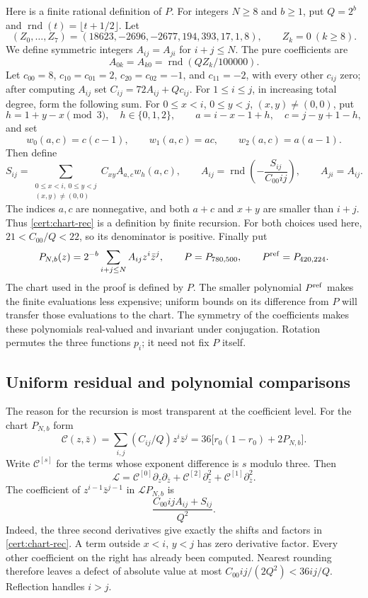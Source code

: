Here is a finite rational definition of $P$.  For integers $N\geq8$ and
$b\geq1$, put $Q=2^b$ and $\operatorname{rnd}(t)=\lfloor t+1/2\rfloor$.
Let
\[
 (Z_0,\ldots,Z_7)=(18623,-2696,-2677,194,393,17,1,8),\qquad Z_k=0\ (k\geq8).
\]
We define symmetric integers $A_{ij}=A_{ji}$ for $i+j\leq N$.  The pure
coefficients are
\[
 A_{0k}=A_{k0}=\operatorname{rnd}(QZ_k/100000).
\]
Let $c_{00}=8$, $c_{10}=c_{01}=2$, $c_{20}=c_{02}=-1$, and $c_{11}=-2$,
with every other $c_{ij}$ zero; after computing $A_{ij}$ set
$C_{ij}=72A_{ij}+Qc_{ij}$.  For $1\leq i\leq j$, in increasing total degree,
form the following sum.  For $0\leq x<i$, $0\leq y<j$, $(x,y)\ne(0,0)$,
put
\[
 h=1+y-x\pmod 3,\quad h\in\{0,1,2\},\qquad
 a=i-x-1+h,\quad c=j-y+1-h,
\]
and set
\[
 w_0(a,c)=c(c-1),\qquad w_1(a,c)=ac,\qquad w_2(a,c)=a(a-1).
\]
Then define
\begin{equation}\label{cert:chart-rec}
 S_{ij}=\sum_{\substack{0\leq x<i,\ 0\leq y<j\\(x,y)\ne(0,0)}}
             C_{xy}A_{a,c}w_h(a,c),\qquad
 A_{ij}=\operatorname{rnd}\left(-\frac{S_{ij}}{C_{00}ij}\right),
 \qquad A_{ji}=A_{ij}.
\end{equation}
The indices $a,c$ are nonnegative, and both $a+c$ and $x+y$ are smaller
than $i+j$.  Thus \eqref{cert:chart-rec} is a definition by finite recursion.
For both choices used here, $21<C_{00}/Q<22$, so its denominator is positive.
Finally put
\begin{equation}\label{cert:P}
 P_{N,b}(z)=2^{-b}\sum_{i+j\leq N}A_{ij}z^i\bar z^j,
 \qquad P=P_{780,500},\qquad P^{\rm ref}=P_{420,224}.
\end{equation}
The chart used in the proof is defined by $P$.  The smaller polynomial
$P^{\rm ref}$ makes the finite evaluations less expensive; uniform bounds
on its difference from $P$ will transfer those evaluations to the chart.
The symmetry of the coefficients makes these polynomials real-valued and
invariant under conjugation.  Rotation permutes the three functions $p_i$;
it need not fix $P$ itself.

\subsection{Uniform residual and polynomial comparisons}
\label{cert:residual}

The reason for the recursion is most transparent at the coefficient level.
For the chart $P_{N,b}$ form
\[
 \mathcal C(z,\bar z)=\sum_{i,j}(C_{ij}/Q)z^i\bar z^j
       =36\bigl[r_0(1-r_0)+2P_{N,b}\bigr].
\]
Write $\mathcal C^{[s]}$ for the terms whose exponent difference is $s$ modulo three.
Then
\[
 \mathcal L=\mathcal C^{[0]}\partial_z\partial_{\bar z}
                 +\mathcal C^{[2]}\partial_z^2+\mathcal C^{[1]}\partial_{\bar z}^2.
\]
The coefficient of $z^{i-1}\bar z^{j-1}$ in $\mathcal L P_{N,b}$ is
\[
 \frac{C_{00}ijA_{ij}+S_{ij}}{Q^2}.
\]
Indeed, the three second derivatives give exactly the shifts and factors in
\eqref{cert:chart-rec}.  A term outside $x<i$, $y<j$ has zero derivative
factor.  Every other coefficient on the right has already been computed.
Nearest rounding therefore leaves a defect of absolute value at most
$C_{00}ij/(2Q^2)<36ij/Q$.  Reflection handles $i>j$.

